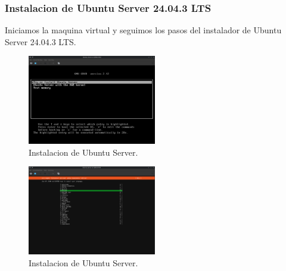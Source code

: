 \documentclass[a4paper,12pt]{article}
\begin{document}
\begin{itemize}
    \subsubsection{Instalacion de Ubuntu Server 24.04.3 LTS}

    Iniciamos la maquina virtual y seguimos los pasos del instalador de Ubuntu Server 24.04.3 LTS.
    \newpage
    \begin{figure}[h!]
        \centering
        \includegraphics[width=0.5\textwidth]{8.png}
        \caption{Instalacion de Ubuntu Server.}
    \end{figure}

    \begin{figure}[h!]
        \centering
        \includegraphics[width=0.5\textwidth]{9.png}
        \caption{Instalacion de Ubuntu Server.}
    \end{figure}


\end{itemize}
\end{document}
